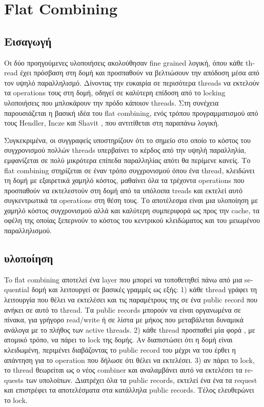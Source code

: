 \section{\textlatin{Flat Combining}}
\subsection{Εισαγωγή}
Οι δύο προηγούμενες υλοποιήσεις ακολούθησαν \textlatin{fine grained} λογική, όπου κάθε \textlatin{thread} έχει πρόσβαση στη δομή και προσπαθούν να βελτιώσουν την απόδοση μέσα από τον υψηλό παραλληλισμό. Δίνοντας την ευκαιρία σε περισότερα threads να εκτελούν τα operations τους στη δομή, οδηγεί σε καλύτερη επίδοση από το \textlatin{locking} υλοποιήσεις που μπλοκάρουν την πρόδο κάποιον \textlatin{threads}. Στη συνέχεια παρουσιάζεται η βασική ιδέα του \textlatin{flat combining}, ενός τρόπου προγραμματισμού από τους \textlatin{Hendler, Incze} και \textlatin{Shavit} \cite{flat_combining}, που αντιτίθεται στη παραπάνω λογική. 

Συγκεκριμένα, οι συγγραφείς υποστηρίζουν ότι το σημείο στο οποίο το κόστος του συγχρονισμού πολλών \textlatin{threads} υπερβαίνει το κέρδος από την υψηλή παραλληλία, εμφανίζεται σε πολύ μικρότερα επίπεδα παραλληλίας απότι θα περίμενε κανείς. Το \textlatin{flat combining} στηρίζεται σε έναν τρόπο συγχρονισμού όπου ένα \textlatin{thread}, κλειδώνει τη δομή με εξαιρετικά χαμηλό κόστος, μαθαίνει όλα τα τρέχοντα \textlatin{operations} που προσπαθούν να εκτελεστούν στη δομή από τα υπόλοιπα \textlatin{treads} και εκτελεί αυτό συγκεντρωτικά τα \textlatin{operations} στη θέση τους. Το αποτέλεσμα είναι μια υλοποίηση με χαμηλό κόστος συγχρονισμού αλλά και καλύτερη συμπεριφορά ως προς την \textlatin{cache}, τα οφέλη της οποίας ξεπερνούν το κόστος του κεντρικού κλειδώματος και του μειωμένου παραλληλισμού.

\subsection{υλοποίηση}
To \textlatin{flat combining} αποτελεί ένα \textlatin{layer} που μπορεί να τοποθετηθεί πάνω από μια \textlatin{sequential} δομή και λειτουργεί σε βασικές γραμμές ως εξής:
1) κάθε \textlatin{thread} γράφει τη λειτουργία που θέλει να εκτελέσει και τις παραμέτρους της σε ένα \textlatin{public record} που ανήκει σε αυτό το \textlatin{thread}. Τα \textlatin{public records} μπορούν να είναι οργανωμένα σε πίνακα, για γρήγορο \textlatin{read/write} ή σε λίστα με μήκος που μεταβάλεται δυναμικά ανάλογα με το πλήθος των \textlatin{active threads}.
2) κάθε \textlatin{thread} προσπαθεί μία φορά , με ατομικό τρόπο, να πάρει το \textlatin{lock} της δομής. Αν διαπιστώσει ότι η δομή είναι κλειδωμένη, περιμένει διαβάζοντας το \textlatin{public record} του μέχρι να του έρθει η απάντηση για το \textlatin{operation} που δήλωσε ότι θέλει να εκτελέσει.
3) αν πάρει το \textlatin{lock}, το \textlatin{thread} θεωρείται ως ο νέος \textlatin{combiner} και αναλαμβάνει αυτό να εκτελέσει τα \textlatin{requests} των υπολοίπων. Διατρέχει όλα τα \textlatin{public records}, εκτελεί ένα ένα τα \textlatin{request} και επιστρέφει τα αποτελέσματα στα κατάλληλα \textlatin{public records}. Τέλος ελευθερώνει το \textlatin{lock}.

